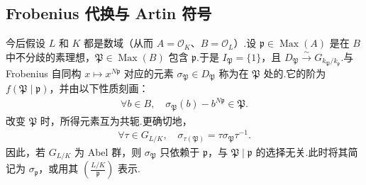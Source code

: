\subsection{Frobenius 代换与 Artin 符号}\label{sec:nt-3-5-6}
今后假设 $L$ 和 $K$ 都是数域（从而 $A=\mathcal O_K$、$B=\mathcal O_L$）.设 $\mathfrak p\in\operatorname{Max}(A)$ 是在 $B$ 中不分歧的素理想，$\mathfrak P\in\operatorname{Max}(B)$ 包含 $\mathfrak p$.于是 $I_{\mathfrak P}=\{1\}$，且 $D_{\mathfrak P}\xrightarrow{\sim}G_{k_{\mathfrak P}/k_{\mathfrak p}}$.与 Frobenius 自同构 $x\mapsto x^{N\mathfrak p}$ 对应的元素 $\sigma_{\mathfrak P}\in D_{\mathfrak P}$ 称为在 $\mathfrak P$ 处的.它的阶为 $f(\mathfrak P\mid\mathfrak p)$，并由以下性质刻画：
\begin{align*}
\forall b\in B,\quad\sigma_{\mathfrak P}(b)-b^{N\mathfrak p}\in\mathfrak P.
\end{align*}
改变 $\mathfrak P$ 时，所得元素互为共轭.更确切地，
\begin{align*}
\forall\tau\in G_{L/K},\quad\sigma_{\tau(\mathfrak P)}=\tau\sigma_{\mathfrak P}\tau^{-1}.
\end{align*}
因此，若 $G_{L/K}$ 为 Abel 群，则 $\sigma_{\mathfrak P}$ 只依赖于 $\mathfrak p$，与 $\mathfrak P\mid\mathfrak p$ 的选择无关.此时将其简记为 $\sigma_{\mathfrak p}$，或用其 $\left(\frac{L/K}{\mathfrak p}\right)$ 表示.

